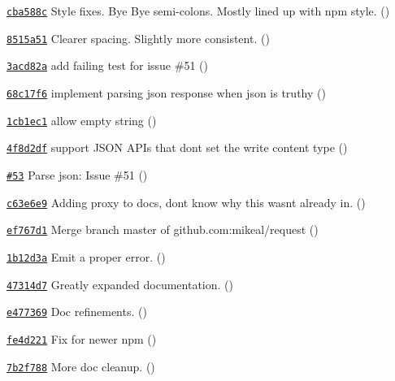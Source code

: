 \begin{DoxyItemize}
\item \href{https://github.com/mikeal/request/commit/cba588cec1e204d70f40f8bd11df0e27dc78ef0c}{\tt cba588c} Style fixes. Bye Bye semi-\/colons. Mostly lined up with npm style. ()
\item \href{https://github.com/mikeal/request/commit/8515a510ccc0a661d7c28fce6e513a7d71be7f8f}{\tt 8515a51} Clearer spacing. Slightly more consistent. ()
\item \href{https://github.com/mikeal/request/commit/3acd82a10e7d973fc5dbaa574c2e8906e48e1ee9}{\tt 3acd82a} add failing test for issue \#51 ()
\item \href{https://github.com/mikeal/request/commit/68c17f6c9a3d7217368b3b8bc61203e6a14eb4f0}{\tt 68c17f6} implement parsing json response when json is truthy ()
\item \href{https://github.com/mikeal/request/commit/1cb1ec114b03394a0a530f245a857d8424cad02d}{\tt 1cb1ec1} allow empty string ()
\item \href{https://github.com/mikeal/request/commit/4f8d2df9f845690667a56e7698dbaf23b5028177}{\tt 4f8d2df} support J\+S\+O\+N A\+P\+Is that don\textquotesingle{}t set the write content type ()
\item \href{https://github.com/mikeal/request/pull/53}{\tt \#53} Parse json\+: Issue \#51 ()
\item \href{https://github.com/mikeal/request/commit/c63e6e96378a2b050bddbe1b39337662f304dc95}{\tt c63e6e9} Adding proxy to docs, don\textquotesingle{}t know why this wasn\textquotesingle{}t already in. ()
\item \href{https://github.com/mikeal/request/commit/ef767d12f13a9c78d3df89add7556f5421204843}{\tt ef767d1} Merge branch \textquotesingle{}master\textquotesingle{} of github.\+com\+:mikeal/request ()
\item \href{https://github.com/mikeal/request/commit/1b12d3a9f48a6142d75fa1790c80eb313388ca44}{\tt 1b12d3a} Emit a proper error. ()
\item \href{https://github.com/mikeal/request/commit/47314d7cb41fe9c3a7717a502bed9cf1b6074ffc}{\tt 47314d7} Greatly expanded documentation. ()
\item \href{https://github.com/mikeal/request/commit/e477369b4bbc271248ee8b686c556567570a6cca}{\tt e477369} Doc refinements. ()
\item \href{https://github.com/mikeal/request/commit/fe4d22109bc1411c29b253756d609856327ff146}{\tt fe4d221} Fix for newer npm ()
\item \href{https://github.com/mikeal/request/commit/7b2f788293e205edc7b46a7fd5304296b5e800e3}{\tt 7b2f788} More doc cleanup. ()

\end{DoxyItemize}
